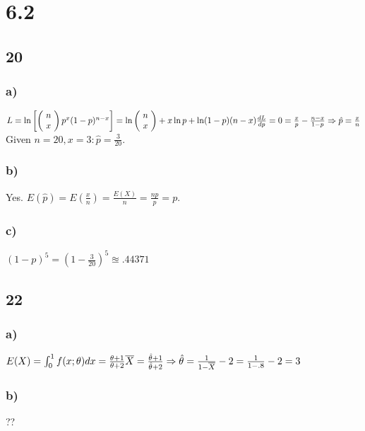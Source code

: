 \documentclass{article}
\begin{document}
\section*{6.2}
	\subsection*{20}
		\subsubsection*{a)}
		$L = \ln \left [\left(\!
    \begin{array}{c}
      n \\
      x
    \end{array}
  \!\right)
 p^x(1-p)^{n-x} \right ] = \ln \left(\!
    \begin{array}{c}
      n \\
      x
    \end{array}
  \!\right) + x\ln p +\ln(1-p)(n-x) \\
\frac{dL}{dp} = 0 = \frac{x}{p} - \frac{n-x}{1-p} \Rightarrow
\hat{p} = \frac{x}{n}\\$
Given $n=20, x=3: \hat{p}  = \frac{3}{20}$.
\subsubsection*{b)}
	Yes. $E(\hat{p}) = E \left ( \frac{x}{n} \right ) = \frac{E(X)}{n} = \frac{np}{p} = p.$
\subsubsection*{c)}				
	$(1-p)^5 = \left ( 1- \frac{3}{20} \right ) ^5 \approxeq .44371$
	\subsection*{22}
		\subsubsection*{a)}
			$E(X) = \int_0^1 f(x; \theta) dx= \frac{\theta + 1}{\theta +2} \\
			\overline{X} = \frac{\hat{\theta} + 1}{\hat{\theta} + 2} \Rightarrow \hat{\theta} = \frac{1}{1-\overline{X}} -2 = \frac{1}{1-.8} -2 = 3$
		\subsubsection*{b)}
			??	
	 		
\end{document}

